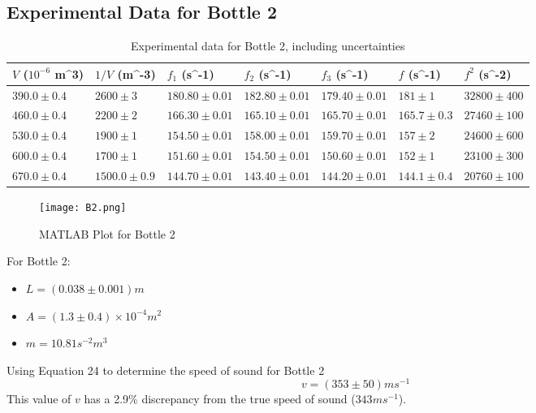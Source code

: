 \documentclass[10pt, a4paper]{article}
\begin{document}
\subsection*{Experimental Data for Bottle 2}
\begin{table}[H]
\centering
\def\arraystretch{1.6}
\begin{tabular}{|l|l|l|l|l|l|l|}
\hline
$V$ ($10^{-6}$ m^3) & $1/V$ (m^{-3}) & $f_1$ (s^{-1})        & $f_2$ (s^{-1})        & $f_3$ (s^{-1})        & $f$ (s^{-1}) & $f^2$ (s^{-2})   \\ \hline
$390.0 \pm 0.4$                                         & $2600 \pm 3$                   & $180.80 \pm 0.01$ & $182.80 \pm 0.01$ & $179.40 \pm 0.01$ & $181 \pm 1$ & $32800 \pm 400$\\\hline
$460.0 \pm 0.4$                                         & $2200 \pm 2$                   & $166.30 \pm 0.01$ & $165.10 \pm 0.01$ & $165.70 \pm 0.01$ & $165.7 \pm 0.3$ & $27460 \pm 100$  \\\hline
$530.0 \pm 0.4$                                        & $1900 \pm 1$                    & $154.50 \pm 0.01$ & $158.00 \pm 0.01$ & $159.70 \pm 0.01$ & $157 \pm 2$ & $24600 \pm 600$ \\ \hline
$600.0 \pm 0.4$                                        & $1700 \pm 1$                    & $151.60 \pm 0.01$ & $154.50 \pm 0.01$  & $150.60 \pm 0.01$  & $152 \pm 1$ & $23100 \pm 300$ \\ \hline
$670.0 \pm 0.4$                                        & $1500.0 \pm 0.9$                    & $144.70 \pm 0.01$ & $143.40 \pm 0.01$ & $144.20 \pm 0.01$ & $144.1 \pm 0.4$ & $20760 \pm 100$\\ \hline
\end{tabular}
\caption{Experimental data for Bottle 2, including uncertainties }
\end{table}

\begin{figure}[H]
    \centering
    \texttt{[image: B2.png]}
    \caption{MATLAB Plot for Bottle 2}
\end{figure}

For Bottle 2: 
\begin{itemize}
\item $L = (0.038 \pm 0.001) \si{m}$ 
\item $A = (1.3 \pm 0.4) \times 10^{-4}\si{m^2}$
\item $m = 10.81 \si{s^{-2}m^{3}}$
\end{itemize}
Using Equation 24 to determine the speed of sound for Bottle 2
$$\boxed{v = (353 \pm 50) \si{ms^{-1}}}$$
This value of $v$ has a 2.9\% discrepancy from the true speed of sound ($343 \si{ms^{-1}}$).
\end{document}
